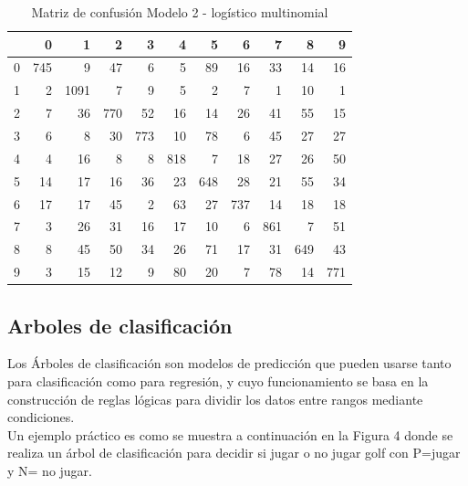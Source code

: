 \documentclass{article}
\begin{document}
\begin{table}[H]
\caption{\small{Matriz de confusión Modelo 2 - logístico multinomial}}
\centering
\begin{tabular}{r|rrrrrrrrrr}
  \hline
 & 0 & 1 & 2 & 3 & 4 & 5 & 6 & 7 & 8 & 9 \\ 
  \hline
0 & 745 &   9 &  47 &   6 &   5 &  89 &  16 &  33 &  14 &  16 \\ 
  1 &   2 & 1091 &   7 &   9 &   5 &   2 &   7 &   1 &  10 &   1 \\ 
  2 &   7 &  36 & 770 &  52 &  16 &  14 &  26 &  41 &  55 &  15 \\ 
  3 &   6 &   8 &  30 & 773 &  10 &  78 &   6 &  45 &  27 &  27 \\ 
  4 &   4 &  16 &   8 &   8 & 818 &   7 &  18 &  27 &  26 &  50 \\ 
  5 &  14 &  17 &  16 &  36 &  23 & 648 &  28 &  21 &  55 &  34 \\ 
  6 &  17 &  17 &  45 &   2 &  63 &  27 & 737 &  14 &  18 &  18 \\ 
  7 &   3 &  26 &  31 &  16 &  17 &  10 &   6 & 861 &   7 &  51 \\ 
  8 &   8 &  45 &  50 &  34 &  26 &  71 &  17 &  31 & 649 &  43 \\ 
  9 &   3 &  15 &  12 &   9 &  80 &  20 &   7 &  78 &  14 & 771 \\ 
   \hline
\end{tabular}
\end{table}



\subsection{Arboles de clasificación}

Los Árboles de clasificación son modelos de predicción que pueden usarse tanto para clasificación como para regresión, y cuyo funcionamiento se basa en la construcción de reglas lógicas para dividir los datos entre rangos mediante condiciones.\\
Un ejemplo práctico es como se muestra a continuación en la Figura 4 donde se realiza un árbol de clasificación para decidir si jugar o no jugar golf con  P=jugar y N= no jugar.
\end{document}
